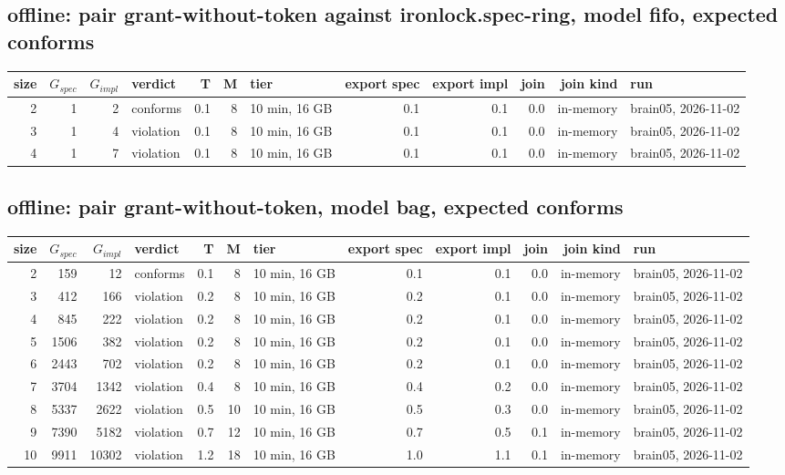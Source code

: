 \documentclass[10pt]{article}
\begin{document}
\subsection*{offline: pair \textsf{grant-without-token} against \textsf{ironlock.spec-ring}, model fifo, expected conforms}
\begin{longtable}{@{}rrrlrrlrrrrl@{}}
\toprule
size & $G_{\mathit{spec}}$ & $G_{\mathit{impl}}$ & verdict & T & M & tier & export spec & export impl & join & join kind & run \\
\midrule
\endhead
\color{red} 2 & 1 & 2 & conforms & 0.1 & 8 & 10 min, 16 GB & 0.1 & 0.1 & 0.0 & in-memory & brain05, 2026-11-02 \\
\color{red} 3 & 1 & 4 & violation & 0.1 & 8 & 10 min, 16 GB & 0.1 & 0.1 & 0.0 & in-memory & brain05, 2026-11-02 \\
\color{red} 4 & 1 & 7 & violation & 0.1 & 8 & 10 min, 16 GB & 0.1 & 0.1 & 0.0 & in-memory & brain05, 2026-11-02 \\
\bottomrule
\end{longtable}
\subsection*{offline: pair \textsf{grant-without-token}, model bag, expected conforms}
\begin{longtable}{@{}rrrlrrlrrrrl@{}}
\toprule
size & $G_{\mathit{spec}}$ & $G_{\mathit{impl}}$ & verdict & T & M & tier & export spec & export impl & join & join kind & run \\
\midrule
\endhead
\color{red} 2 & 159 & 12 & conforms & 0.1 & 8 & 10 min, 16 GB & 0.1 & 0.1 & 0.0 & in-memory & brain05, 2026-11-02 \\
\color{red} 3 & 412 & 166 & violation & 0.2 & 8 & 10 min, 16 GB & 0.2 & 0.1 & 0.0 & in-memory & brain05, 2026-11-02 \\
\color{red} 4 & 845 & 222 & violation & 0.2 & 8 & 10 min, 16 GB & 0.2 & 0.1 & 0.0 & in-memory & brain05, 2026-11-02 \\
\color{red} 5 & 1506 & 382 & violation & 0.2 & 8 & 10 min, 16 GB & 0.2 & 0.1 & 0.0 & in-memory & brain05, 2026-11-02 \\
\color{red} 6 & 2443 & 702 & violation & 0.2 & 8 & 10 min, 16 GB & 0.2 & 0.1 & 0.0 & in-memory & brain05, 2026-11-02 \\
\color{red} 7 & 3704 & 1342 & violation & 0.4 & 8 & 10 min, 16 GB & 0.4 & 0.2 & 0.0 & in-memory & brain05, 2026-11-02 \\
\color{red} 8 & 5337 & 2622 & violation & 0.5 & 10 & 10 min, 16 GB & 0.5 & 0.3 & 0.0 & in-memory & brain05, 2026-11-02 \\
\color{red} 9 & 7390 & 5182 & violation & 0.7 & 12 & 10 min, 16 GB & 0.7 & 0.5 & 0.1 & in-memory & brain05, 2026-11-02 \\
\color{red} 10 & 9911 & 10302 & violation & 1.2 & 18 & 10 min, 16 GB & 1.0 & 1.1 & 0.1 & in-memory & brain05, 2026-11-02 \\
\bottomrule
\end{longtable}
\end{document}
